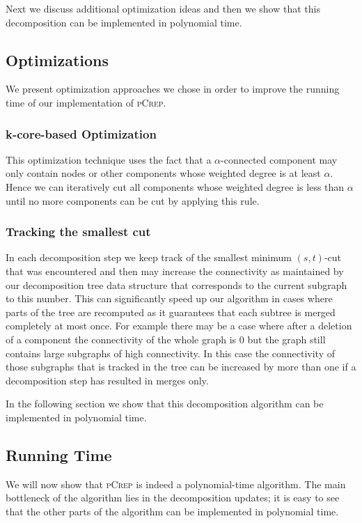 \documentclass[a4paper,UKenglish,cleveref, autoref, thm-restate,authorcolumns]{lipics-v2019}
\newcommand{\adjDel}{\textsc{pCrep}}
\begin{document}
Next we discuss additional optimization ideas and then we show that this decomposition can be implemented in polynomial time.


\subsection{Optimizations}
	 We present optimization approaches we chose in order to improve the running time of our implementation of \adjDel{}.
	
	 \subsubsection{k-core-based Optimization}
	
	This optimization technique uses the fact that a $\alpha$-connected component 
	may only contain nodes or other components whose weighted degree is at least 
	$\alpha$. Hence we can iteratively cut all components whose weighted degree is 
	less than $\alpha$ until no more components can be cut by applying this rule.
	
	\subsubsection{Tracking the smallest cut}
	
	In each decomposition step we keep track of the smallest minimum $(s,t)$-cut 
	that was encountered and then may increase the connectivity as maintained by 
	our decomposition tree data structure that corresponds to the current subgraph 
	to this number. This can significantly speed up our algorithm in cases where 
	parts of the tree are recomputed as it guarantees that each subtree is merged 
	completely at most once. For example there may be a case where after a deletion 
	of a component the connectivity of the whole graph is 0 but the graph still 
	contains large subgraphs of high connectivity. In this case the connectivity 
	of those subgraphs that is tracked in the tree can be increased by more than 
	one if a decomposition step has resulted in merges only.

	In the following section we show that this decomposition algorithm can be implemented in polynomial time.


\subsection{Running Time}
\label{run_time_sec}

We will now show that \adjDel{} is indeed a polynomial-time
algorithm.
The main bottleneck of the algorithm lies in the decomposition updates;
it is easy to see that 
the other parts of the algorithm can be implemented in polynomial time.
\end{document}

